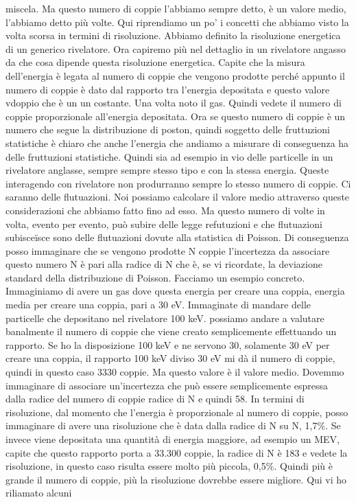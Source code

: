 miscela. Ma questo numero di coppie l'abbiamo sempre detto, è un valore medio, l'abbiamo detto più volte. Qui riprendiamo un po' i concetti che abbiamo visto la volta scorsa in termini di risoluzione. Abbiamo definito la risoluzione energetica di un generico rivelatore. Ora capiremo più nel dettaglio in un rivelatore angasso da che cosa dipende questa risoluzione energetica. Capite che la misura dell'energia è legata al numero di coppie che vengono prodotte perché appunto il numero di coppie è dato dal rapporto tra l'energia depositata e questo valore vdoppio che è un un costante. Una volta noto il gas. Quindi vedete il numero di coppie proporzionale all'energia depositata. Ora se questo numero di coppie è un numero che segue la distribuzione di poston, quindi soggetto delle fruttuzioni statistiche è chiaro che anche l'energia che andiamo a misurare di conseguenza ha delle fruttuzioni statistiche. Quindi sia ad esempio in vio delle particelle in un rivelatore anglasse, sempre sempre stesso tipo e con la stessa energia. Queste interagendo con rivelatore non produrranno sempre lo stesso numero di coppie. Ci saranno delle flutuazioni. Noi possiamo calcolare il valore medio attraverso queste considerazioni che abbiamo fatto fino ad esso. Ma questo numero di volte in volta, evento per evento, può subire delle legge refutuzioni e che flutuazioni subisceïsce sono delle flutuazioni dovute alla statistica di Poisson. Di conseguenza posso immaginare che se vengono prodotte N coppie l'incertezza da associare questo numero N è pari alla radice di N che è, se vi ricordate, la deviazione standard della distribuzione di Poisson. Facciamo un esempio concreto. Immaginiamo di avere un gas dove questa energia per creare una coppia, energia media per creare una coppia, pari a 30 eV. Immaginate di mandare delle particelle che depositano nel rivelatore 100 keV. possiamo andare a valutare banalmente il numero di coppie che viene creato semplicemente effettuando un rapporto. Se ho la disposizione 100 keV e ne servono 30, solamente 30 eV per creare una coppia, il rapporto 100 keV diviso 30 eV mi dà il numero di coppie, quindi in questo caso 3330 coppie. Ma questo valore è il valore medio. Dovemmo immaginare di associare un'incertezza che può essere semplicemente espressa dalla radice del numero di coppie radice di N e quindi 58. In termini di risoluzione, dal momento che l'energia è proporzionale al numero di coppie, posso immaginare di avere una risoluzione che è data dalla radice di N su N, 1,7\%. Se invece viene depositata una quantità di energia maggiore, ad esempio un MEV, capite che questo rapporto porta a 33.300 coppie, la radice di N è 183 e vedete la risoluzione, in questo caso risulta essere molto più piccola, 0,5\%. Quindi più è grande il numero di coppie, più la risoluzione dovrebbe essere migliore. Qui vi ho riliamato alcuni 

